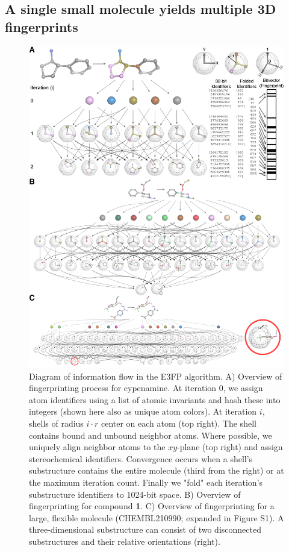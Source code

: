 \documentclass[../../main.tex]{subfiles}
\begin{document}
\begin{refsection}
	\subsection*{A single small molecule yields multiple 3D fingerprints}

	\begin{figure}%
		\centering  \includegraphics[width=13.3cm]{fig1.png}
		\caption[Diagram of information flow in the E3FP algorithm]{
			Diagram of information flow in the E3FP algorithm.
			A) Overview of fingerprinting process for cypenamine.
			At iteration 0, we assign atom identifiers using a list of atomic invariants and hash these into integers (shown here also as unique atom colors).
			At iteration $i$, shells of radius $i \cdot r$ center on each atom (top right).
			The shell contains bound and unbound neighbor atoms.
			Where possible, we uniquely align neighbor atoms to the $xy$-plane (top right) and assign stereochemical identifiers.
			Convergence occurs when a shell's substructure contains the entire molecule (third from the right) or at the maximum iteration count.
			Finally we "fold" each iteration's substructure identifiers to 1024-bit space.
			B) Overview of fingerprinting for compound \textbf{1}.
			C) Overview of fingerprinting for a large, flexible molecule (CHEMBL210990; expanded in Figure S1).
			A three-dimensional substructure can consist of two disconnected substructures and their relative orientations (right).}
		\label{fig:fig1}
	\end{figure}


\end{refsection}
\end{document}
